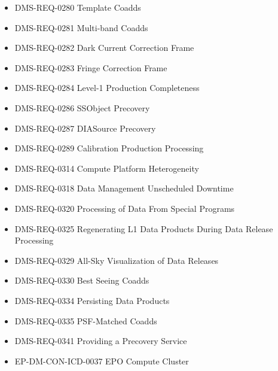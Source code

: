 \begin{itemize}
\item DMS-REQ-0280 Template Coadds
\item DMS-REQ-0281 Multi-band Coadds
\item DMS-REQ-0282 Dark Current Correction Frame
\item DMS-REQ-0283 Fringe Correction Frame
\item DMS-REQ-0284 Level-1 Production Completeness
\item DMS-REQ-0286 SSObject Precovery
\item DMS-REQ-0287 DIASource Precovery
\item DMS-REQ-0289 Calibration Production Processing
\item DMS-REQ-0314 Compute Platform Heterogeneity
\item DMS-REQ-0318 Data Management Unscheduled Downtime
\item DMS-REQ-0320 Processing of Data From Special Programs
\item DMS-REQ-0325 Regenerating L1 Data Products During Data Release Processing
\item DMS-REQ-0329 All-Sky Visualization of Data Releases
\item DMS-REQ-0330 Best Seeing Coadds
\item DMS-REQ-0334 Persisting Data Products
\item DMS-REQ-0335 PSF-Matched Coadds
\item DMS-REQ-0341 Providing a Precovery Service
\item EP-DM-CON-ICD-0037 EPO Compute Cluster
\end{itemize}
